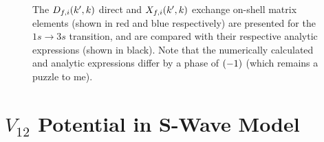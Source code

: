 \documentclass{article}
\begin{document}
\begin{figure}[h]
  \begin{center}
    
  \end{center}
  \caption[On-Shell Matrix Elements 1s-3s]{
    The $D_{f, i}(k', k)$ direct and $X_{f, i}(k', k)$ exchange on-shell
    matrix elements (shown in red and blue respectively) are presented for the
    $1s \to 3s$ transition, and are compared with their respective analytic
    expressions (shown in black).
    Note that the numerically calculated and analytic expressions differ by a
    phase of $(-1)$ (which remains a puzzle to me).
  }
  \label{fig:on-me-1s-3s}
\end{figure}

\clearpage

\section{$V_{1 2}$ Potential in S-Wave Model}
\label{sec:v12-swave}
\end{document}
